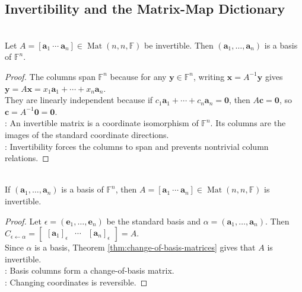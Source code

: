 \subsection{Invertibility and the Matrix-Map Dictionary}
\begin{theorem} \label{thm:invertible-matrix-columns-basis} \\
Let $A=[\mathbf{a}_1\ \cdots\ \mathbf{a}_n]\in\operatorname{Mat}(n,n,\mathbb{F})$ be invertible. Then $(\mathbf{a}_1,\ldots,\mathbf{a}_n)$ is a basis of $\mathbb{F}^n$.
\begin{proof}
The columns span $\mathbb{F}^n$ because for any $\mathbf{y}\in\mathbb{F}^n$, writing $\mathbf{x}=A^{-1}\mathbf{y}$ gives $\mathbf{y}=A\mathbf{x}=x_1\mathbf{a}_1+\cdots+x_n\mathbf{a}_n$.\\
They are linearly independent because if $c_1\mathbf{a}_1+\cdots+c_n\mathbf{a}_n=\mathbf{0}$, then $A\mathbf{c}=\mathbf{0}$, so $\mathbf{c}=A^{-1}\mathbf{0}=\mathbf{0}$.\\
: An invertible matrix is a coordinate isomorphism of $\mathbb{F}^n$. Its columns are the images of the standard coordinate directions.\\
: Invertibility forces the columns to span and prevents nontrivial column relations.
\end{proof}
\end{theorem}

\begin{corollary} \label{cor:basis-columns-form-invertible-matrix} \\
If $(\mathbf{a}_1,\ldots,\mathbf{a}_n)$ is a basis of $\mathbb{F}^n$, then $A=[\mathbf{a}_1\ \cdots\ \mathbf{a}_n]\in\operatorname{Mat}(n,n,\mathbb{F})$ is invertible.
\begin{proof}
Let $\epsilon=(\mathbf{e}_1,\ldots,\mathbf{e}_n)$ be the standard basis and $\alpha=(\mathbf{a}_1,\ldots,\mathbf{a}_n)$. Then
$C_{\epsilon \leftarrow \alpha} =
\begin{bmatrix}
[\mathbf{a}_1]_{\epsilon} & \cdots & [\mathbf{a}_n]_{\epsilon}
\end{bmatrix} =A$.\\
Since $\alpha$ is a basis, Theorem \ref{thm:change-of-basis-matrices} gives that $A$ is invertible.\\
: Basis columns form a change-of-basis matrix.\\
: Changing coordinates is reversible.
\end{proof}
\end{corollary}

